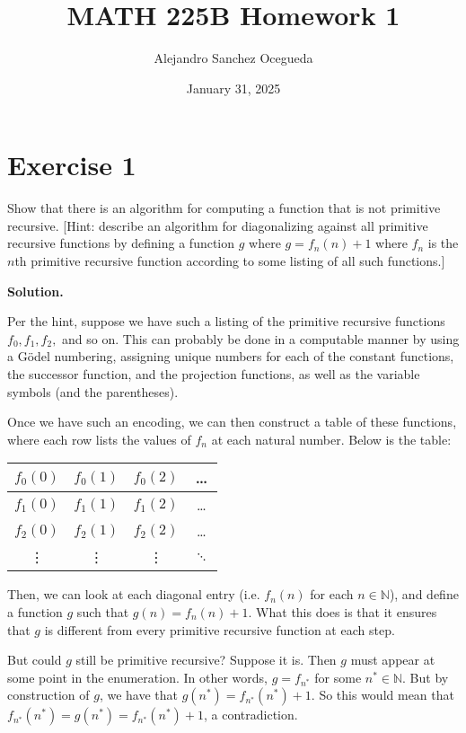 \documentclass{article}
\title{MATH 225B Homework 1}
\author{Alejandro Sanchez Ocegueda}
\date{January 31, 2025}
\newcommand{\nat}{\mathbb{N}}
\newcommand{\solution}{\noindent \textbf{Solution.}}
\begin{document}
\maketitle

\section*{Exercise 1}
Show that there is an algorithm for computing a function that is not primitive recursive.
[Hint: describe an algorithm for diagonalizing against all primitive recursive functions by defining a function $g$ where $g = f_n(n) + 1$ where $f_n$ is the $n$th primitive recursive function according to some listing of all such functions.]

\vspace{3mm}
\solution

Per the hint, suppose we have such a listing of the primitive recursive functions $f_0, f_1, f_2,$ and so on.
This can probably be done in a computable manner by using a Gödel numbering, assigning unique numbers for each of the constant functions, the successor function, and the projection functions, as well as the variable symbols (and the parentheses).

Once we have such an encoding, we can then construct a table of these functions, where each row lists the values of $f_n$ at each natural number.
Below is the table:
\begin{table}[h!]
  \begin{center}
    \label{tab:table1}
    \begin{tabular}{|c|c|c|c} %
    \hline
      $f_0(0)$ & $f_0(1)$ & $f_0(2)$ & \dots \\
      \hline
      $f_1(0)$ & $f_1(1)$ & $f_1(2)$ & \dots\\
      \hline
      $f_2(0)$ & $f_2(1)$ & $f_2(2)$ & \dots \\
      \hline
      \vdots & \vdots & \vdots & $\ddots$
    \end{tabular}
  \end{center}
\end{table}
Then, we can look at each diagonal entry (i.e. $f_n(n)$ for each $n \in \nat$), and define a function $g$ such that $g(n) = f_n(n) + 1$.
What this does is that it ensures that $g$ is different from every primitive recursive function at each step.

But could $g$ still be primitive recursive?
Suppose it is.
Then $g$ must appear at some point in the enumeration.
In other words, $g = f_{n^*}$ for some $n^* \in \nat$.
But by construction of $g$, we have that $g(n^*) = f_{n^*}(n^*) + 1$.
So this would mean that $f_{n^*}(n^*) = g(n^*) = f_{n^*}(n^*)+1$, a contradiction.
\end{document}

